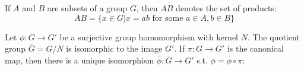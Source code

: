 \begin{definition}

  If $A$ and $B$ are subsets of a group $G$, then $AB$ denotes the set of products:
  \[AB = \{x \in G | x = ab \text{ for some } a \in A , b \in B\}\]

\end{definition}

\begin{definition}
  Let $\phi:G \rightarrow G'$ be a surjective group homomorphism with kernel $N$. The
  quotient group $\bar{G}=G/N$ is isomorphic to the image $G'$.
  If $\pi: G \rightarrow G'$ is the canonical map, then there is a unique isomorphism
  $\bar{\phi}:\bar{G} \rightarrow G'$ s.t. $\phi = \bar{\phi} \circ \pi$:



\end{definition}

